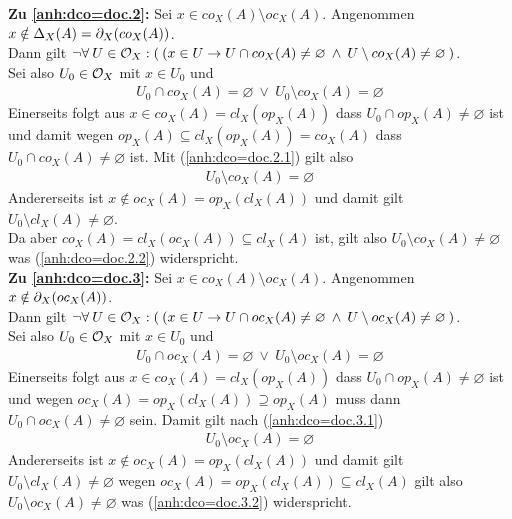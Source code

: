 \noindent	
\textbf{Zu \ref{anh:dco=doc.2}:}
	Sei $x \in co_X(A) \setminus oc_X(A)$. Angenommen $x \notin \Delta_X(A) = \partial_X(co_X(A))$. \\
	Dann gilt $\neg \forall\: U \in \mathcal{O}_X: (\: (x \in U \to U \cap co_X(A) \neq \varnothing \:\land\: U \setminus co_X(A) \neq \varnothing \:)$. \\
	Sei also $U_0 \in \mathcal{O}_X$ mit $x \in U_0$ und 
	\begin{align}
		U_0 \cap co_X(A) = \varnothing \:\lor\: U_0 \setminus co_X(A) = \varnothing \label{anh:dco=doc.2.1}
	\end{align}
	Einerseits folgt aus $x \in co_X(A) = cl_X(op_X(A))$ dass $U_0 \cap op_X(A) \neq \varnothing$ ist und damit wegen $op_X(A) \subseteq cl_X(op_X(A)) = co_X(A)$ dass $U_0 \cap co_X(A) \neq \varnothing$ ist. Mit (\ref{anh:dco=doc.2.1}) gilt also
	\begin{align}
		U_0 \setminus co_X(A) = \varnothing \label{anh:dco=doc.2.2}
	\end{align}
	Andererseits ist $x \notin oc_X(A) = op_X(cl_X(A))$ und damit gilt $U_0 \setminus cl_X(A) \neq \varnothing$. \\
	Da aber $co_X(A) =  cl_X(oc_X(A)) \subseteq cl_X(A)$ ist, gilt also $U_0 \setminus co_X(A) \neq \varnothing$ was (\ref{anh:dco=doc.2.2}) widerspricht. \\
	
\noindent	
\textbf{Zu \ref{anh:dco=doc.3}:}
	Sei $x \in co_X(A) \setminus oc_X(A)$. Angenommen $x \notin \partial_X(oc_X(A))$. \\
	Dann gilt $\neg \forall\: U \in \mathcal{O}_X: (\: (x \in U \to U \cap oc_X(A) \neq \varnothing \:\land\: U \setminus oc_X(A) \neq \varnothing \:)$. \\
	Sei also $U_0 \in \mathcal{O}_X$ mit $x \in U_0$ und 
	\begin{align}
		U_0 \cap oc_X(A) = \varnothing \:\lor\: U_0 \setminus oc_X(A) = \varnothing \label{anh:dco=doc.3.1}
	\end{align}
	Einerseits folgt aus $x \in co_X(A) = cl_X(op_X(A))$ dass $U_0 \cap op_X(A) \neq \varnothing$ ist und wegen $oc_X(A) = op_X(cl_X(A)) \supseteq op_X(A)$ muss dann $U_0 \cap oc_X(A) \neq \varnothing$ sein. Damit gilt nach (\ref{anh:dco=doc.3.1})
	\begin{align}
		U_0 \setminus oc_X(A) = \varnothing \label{anh:dco=doc.3.2}
	\end{align}	
	Andererseits ist $x \notin oc_X(A) = op_X(cl_X(A))$ und damit gilt $U_0 \setminus cl_X(A) \neq \varnothing$ wegen $oc_X(A) = op_X(cl_X(A)) \subseteq cl_X(A)$ gilt also $U_0 \setminus oc_X(A) \neq \varnothing$ was (\ref{anh:dco=doc.3.2}) widerspricht.\\
	
